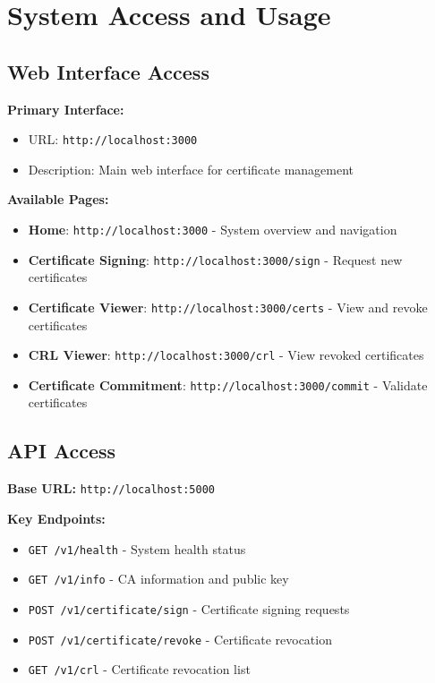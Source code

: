 \section{System Access and Usage}

\subsection{Web Interface Access}

\textbf{Primary Interface:}
\begin{itemize}
    \item URL: \texttt{http://localhost:3000}
    \item Description: Main web interface for certificate management
\end{itemize}

\textbf{Available Pages:}
\begin{itemize}
    \item \textbf{Home}: \texttt{http://localhost:3000} - System overview and navigation
    \item \textbf{Certificate Signing}: \texttt{http://localhost:3000/sign} - Request new certificates
    \item \textbf{Certificate Viewer}: \texttt{http://localhost:3000/certs} - View and revoke certificates
    \item \textbf{CRL Viewer}: \texttt{http://localhost:3000/crl} - View revoked certificates
    \item \textbf{Certificate Commitment}: \texttt{http://localhost:3000/commit} - Validate certificates
\end{itemize}

\subsection{API Access}

\textbf{Base URL:} \texttt{http://localhost:5000}

\textbf{Key Endpoints:}
\begin{itemize}
    \item \texttt{GET /v1/health} - System health status
    \item \texttt{GET /v1/info} - CA information and public key
    \item \texttt{POST /v1/certificate/sign} - Certificate signing requests
    \item \texttt{POST /v1/certificate/revoke} - Certificate revocation
    \item \texttt{GET /v1/crl} - Certificate revocation list
\end{itemize}

